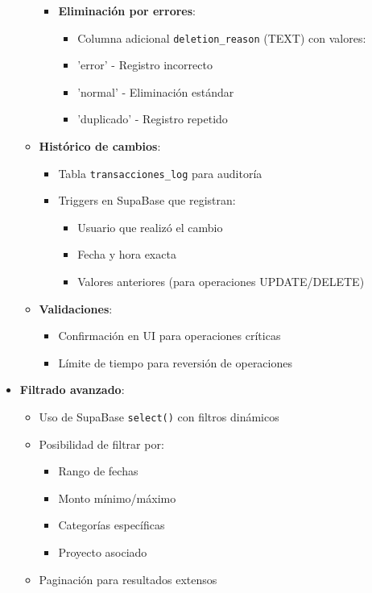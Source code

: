 \begin{itemize}
\begin{itemize}
\begin{itemize}
    \item \textbf{Eliminación por errores}:
    \begin{itemize}
        \item Columna adicional \texttt{deletion\_reason} (TEXT) con valores:
        \item \quad 'error' - Registro incorrecto
        \item \quad 'normal' - Eliminación estándar
        \item \quad 'duplicado' - Registro repetido
    \end{itemize}
\end{itemize}
    \item \textbf{Histórico de cambios}:
    \begin{itemize}
        \item Tabla \texttt{transacciones\_log} para auditoría
        \item Triggers en SupaBase que registran:
        \begin{itemize}
            \item Usuario que realizó el cambio
            \item Fecha y hora exacta
            \item Valores anteriores (para operaciones UPDATE/DELETE)
        \end{itemize}
    \end{itemize}
    
    \item \textbf{Validaciones}:
    \begin{itemize}
        \item Confirmación en UI para operaciones críticas
        \item Límite de tiempo para reversión de operaciones
    \end{itemize}
\end{itemize}
    
    \item \textbf{Filtrado avanzado}:
    \begin{itemize}
        \item Uso de SupaBase \texttt{select()} con filtros dinámicos
        \item Posibilidad de filtrar por:
        \begin{itemize}
            \item Rango de fechas
            \item Monto mínimo/máximo
            \item Categorías específicas
            \item Proyecto asociado
        \end{itemize}
        \item Paginación para resultados extensos
    \end{itemize}
    

\end{itemize}
